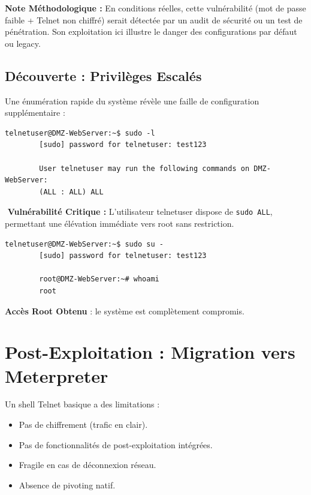 \documentclass[12pt,a4paper,openany]{report}
\newcommand{\warningsymbol}{\ding{55}}  %
\begin{document}
\textbf{Note Méthodologique :} En conditions réelles, cette vulnérabilité (mot de passe faible + Telnet non chiffré) serait détectée par un audit de sécurité ou un test de pénétration. Son exploitation ici illustre le danger des configurations par défaut ou legacy.

\subsection{Découverte : Privilèges Escalés}

Une énumération rapide du système révèle une faille de configuration supplémentaire :

\begin{lstlisting}[caption=Decouverte de privileges sudo illimites]
		telnetuser@DMZ-WebServer:~$ sudo -l
		[sudo] password for telnetuser: test123
		
		User telnetuser may run the following commands on DMZ-WebServer:
		(ALL : ALL) ALL
	\end{lstlisting}

\textcolor{warning}{\warningsymbol}️ \textbf{Vulnérabilité Critique :} L'utilisateur telnetuser dispose de \texttt{sudo ALL}, permettant une élévation immédiate vers root sans restriction.

\begin{lstlisting}[caption=Elevation vers root]
		telnetuser@DMZ-WebServer:~$ sudo su -
		[sudo] password for telnetuser: test123
		
		root@DMZ-WebServer:~# whoami
		root
	\end{lstlisting}

\textcolor{success}{\checkmark} \textbf{Accès Root Obtenu} : le système est complètement compromis.

\section{Post-Exploitation : Migration vers Meterpreter}

Un shell Telnet basique a des limitations :
\begin{itemize}
	\item Pas de chiffrement (trafic en clair).
	\item Pas de fonctionnalités de post-exploitation intégrées.
	\item Fragile en cas de déconnexion réseau.
	\item Absence de pivoting natif.
\end{itemize}
\end{document}
